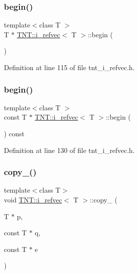 \subsubsection{\texorpdfstring{begin()}{begin()}\hspace{0.1cm}{\footnotesize\ttfamily [1/2]}}
{\footnotesize\ttfamily template$<$class T $>$ \\
T $\ast$ \hyperlink{classTNT_1_1i__refvec}{T\+N\+T\+::i\+\_\+refvec}$<$ T $>$\+::begin (\begin{DoxyParamCaption}{ }\end{DoxyParamCaption})\hspace{0.3cm}{\ttfamily [inline]}}



Definition at line 115 of file tnt\+\_\+i\+\_\+refvec.\+h.

\mbox{\label{classTNT_1_1i__refvec_ad804687b0ece34c37104629467cae2db}} 
\subsubsection{\texorpdfstring{begin()}{begin()}\hspace{0.1cm}{\footnotesize\ttfamily [2/2]}}
{\footnotesize\ttfamily template$<$class T $>$ \\
const T $\ast$ \hyperlink{classTNT_1_1i__refvec}{T\+N\+T\+::i\+\_\+refvec}$<$ T $>$\+::begin (\begin{DoxyParamCaption}{ }\end{DoxyParamCaption}) const\hspace{0.3cm}{\ttfamily [inline]}}



Definition at line 130 of file tnt\+\_\+i\+\_\+refvec.\+h.

\mbox{\label{classTNT_1_1i__refvec_ad8f94f1699e8f34dcfd7579be9121022}} 
\subsubsection{\texorpdfstring{copy\+\_\+()}{copy\_()}}
{\footnotesize\ttfamily template$<$class T$>$ \\
void \hyperlink{classTNT_1_1i__refvec}{T\+N\+T\+::i\+\_\+refvec}$<$ T $>$\+::copy\+\_\+ (\begin{DoxyParamCaption}\item[{T $\ast$}]{p,  }\item[{const T $\ast$}]{q,  }\item[{const T $\ast$}]{e }\end{DoxyParamCaption})}



